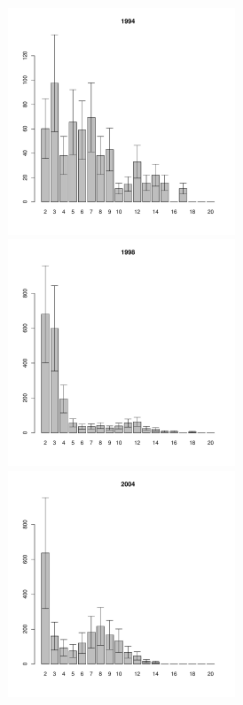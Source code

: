 \documentclass[12pt, a4paper]{article}
\begin{document}
\begin{figure}[h]
\begin{multicols}{3}
\hfill
\includegraphics[width=60mm]{../White_Sea/Luvenga_II_razrez/fucus_zone2_1994_.pdf}
\hfill
\includegraphics[width=60mm]{../White_Sea/Luvenga_II_razrez/fucus_zone2_1998_.pdf}
\hfill
\includegraphics[width=60mm]{../White_Sea/Luvenga_II_razrez/fucus_zone2_2004_.pdf}
\end{multicols}



\end{figure}
\end{document}
